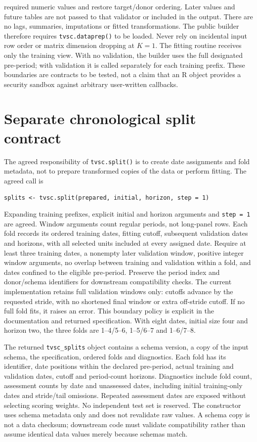 \documentclass[11pt]{article}
\begin{document}
required numeric values and restore target/donor ordering. Later values and
future tables are not passed to that validator or included in the output.
There are no lags, summaries, imputations or fitted transformations.
The public builder therefore requires \texttt{tvsc.dataprep()} to be loaded.
Never
rely on incidental input row order or matrix dimension dropping at $K=1$.
The fitting routine receives only the training view. With no validation,
the builder uses the full designated pre-period; with validation it is
called separately for each training prefix. These boundaries are contracts
to be tested, not a claim that an R object provides a security
sandbox against arbitrary user-written callbacks.

\section{Separate chronological split contract}\label{sec:splits}
The agreed responsibility of \texttt{tvsc.split()} is to create date
assignments and fold metadata, not to prepare transformed copies of the
data or perform fitting. The agreed call is
\begin{verbatim}
splits <- tvsc.split(prepared, initial, horizon, step = 1)
\end{verbatim}
Expanding training prefixes, explicit initial and horizon arguments and
\texttt{step = 1} are agreed. Window arguments count
regular periods, not long-panel rows. Each fold records its ordered
training dates, fitting cutoff, subsequent validation dates and horizons,
with all selected units included at every assigned date. Require at least
three training dates, a nonempty later validation window, positive integer
window arguments, no overlap between training and validation within a
fold, and dates confined to the eligible pre-period. Preserve the period
index and donor/schema identifiers for downstream compatibility checks.
The current implementation retains full validation windows only: cutoffs
advance by the requested stride, with no shortened final window or extra
off-stride cutoff. If no full fold fits, it raises an error. This boundary
policy is explicit in the documentation and returned specification.
With eight dates, initial size four and horizon two, the three folds are
1--4/5--6, 1--5/6--7 and 1--6/7--8.

The returned \texttt{tvsc\_splits} object contains a schema version, a copy
of the input schema, the specification, ordered folds and diagnostics.
Each fold has its identifier, date positions within the declared pre-period,
actual training and validation dates, cutoff and period-count horizons.
Diagnostics include fold count, assessment counts by date and unassessed
dates, including initial training-only dates and stride/tail omissions.
Repeated assessment dates are exposed without selecting scoring weights.
No independent test set is reserved. The constructor uses schema metadata
only and does not revalidate raw values. A schema copy is not a data checksum;
downstream code must validate compatibility rather than assume identical
data values merely because schemas match.
\end{document}
